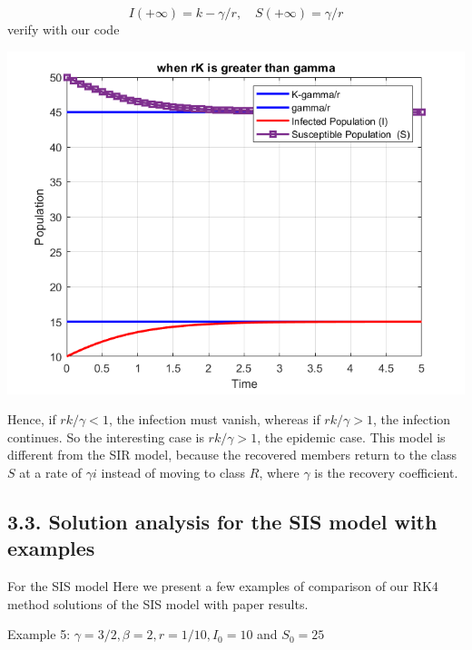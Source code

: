 \documentclass[10pt]{article}
\begin{document}
\begin{equation*}
I(+\infty)=k-\gamma / r, \quad S(+\infty)=\gamma / r \tag{51}
\end{equation*}
verify with our code
  \begin{center}
\includegraphics[max width=\textwidth]{images/when_rK_is_greater_than_gamma.png}
\end{center}

Hence, if $r k / \gamma<1$, the infection must vanish, whereas if $r k / \gamma>1$, the infection continues. So the interesting case is $r k / \gamma>1$, the epidemic case. This model is different from the SIR model, because the recovered members return to the class $S$ at a rate of $\gamma i$ instead of moving to class $R$, where $\gamma$ is the recovery coefficient.
\subsection*{3.3.
Solution analysis for the SIS model with examples}

For the SIS model Here we present a few examples of comparison of our RK4 method  solutions of the SIS model with paper results.

\vspace{2\baselineskip}

 Example 5: $\gamma=3 / 2, \beta=2, r=1 / 10, I_{0}=10$ and $S_{0}=25$
  
\end{document}
